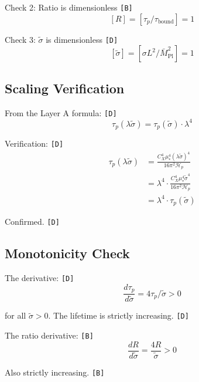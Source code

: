 \documentclass[11pt,a4paper]{article}
\newcommand{\tagD}{\textcolor{green!50!black}{\texttt{[D]}}}
\newcommand{\tagB}{\textcolor{purple!70!black}{\texttt{[B]}}}
\theoremstyle{definition}
\begin{document}
Check 2: Ratio is dimensionless \tagB{}
\begin{equation}
\label{eq:dim-check-3}
[R] = [\tau_p/\tau_{\text{bound}}] = 1
\end{equation}

Check 3: $\tilde{\sigma}$ is dimensionless \tagD{}
\begin{equation}
\label{eq:dim-check-4}
[\tilde{\sigma}] = [\sigma L^2/\bar{M}_{\text{Pl}}^2] = 1
\end{equation}

\subsection{Scaling Verification}
\label{subsec:scaling-verify}

From the Layer A formula: \tagD{}
\begin{equation}
\label{eq:scale-verify-1}
\tau_p(\lambda\tilde{\sigma}) = \tau_p(\tilde{\sigma}) \cdot \lambda^4
\end{equation}

Verification: \tagD{}
\begin{align}
\label{eq:scale-verify-2}
\tau_p(\lambda\tilde{\sigma}) &= \frac{C_X^4 \mu_*^4 (\lambda\tilde{\sigma})^4}{16\pi^2 \mathcal{H}_p} \\
\label{eq:scale-verify-3}
&= \lambda^4 \cdot \frac{C_X^4 \mu_*^4 \tilde{\sigma}^4}{16\pi^2 \mathcal{H}_p} \\
\label{eq:scale-verify-4}
&= \lambda^4 \cdot \tau_p(\tilde{\sigma})
\end{align}

Confirmed. \tagD{}

\subsection{Monotonicity Check}
\label{subsec:mono-check}

The derivative: \tagD{}
\begin{equation}
\label{eq:mono-1}
\frac{d\tau_p}{d\tilde{\sigma}} = 4\tau_p/\tilde{\sigma} > 0
\end{equation}

for all $\tilde{\sigma} > 0$. The lifetime is strictly increasing. \tagD{}

The ratio derivative: \tagB{}
\begin{equation}
\label{eq:mono-2}
\frac{dR}{d\tilde{\sigma}} = \frac{4R}{\tilde{\sigma}} > 0
\end{equation}

Also strictly increasing. \tagB{}
\end{document}
